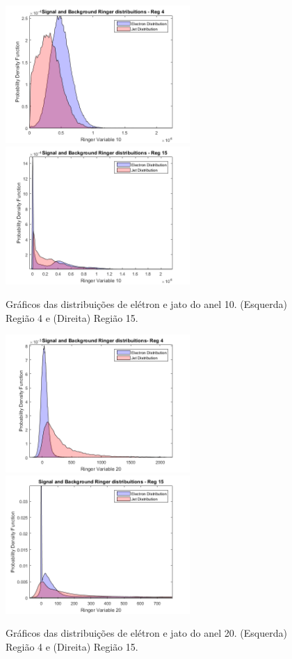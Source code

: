 \begin{figure}[H]
	\centering
	\includegraphics[width=7cm]{./textuais/algoritmo/figuras/DISTKERNELET3ETA0VAR10KF1.png}
    \includegraphics[width=7cm]{./textuais/algoritmo/figuras/DISTKERNELET4ETA2VAR10KF1.png}\\
	\caption{Gráficos das distribuições de elétron e jato do anel 10. (Esquerda) Região 4 e (Direita) Região 15.}
	\label{fig:9T21}
\end{figure}

\begin{figure}[H]
	\centering
	\includegraphics[width=7cm]{./textuais/algoritmo/figuras/DISTKERNELET3ETA0VAR20KF1.png}
    \includegraphics[width=7cm]{./textuais/algoritmo/figuras/DISTKERNELET4ETA2VAR20KF1.png}\\
	\caption{Gráficos das distribuições de elétron e jato do anel 20. (Esquerda) Região 4 e (Direita) Região 15.}
	\label{fig:9T22}
\end{figure}

